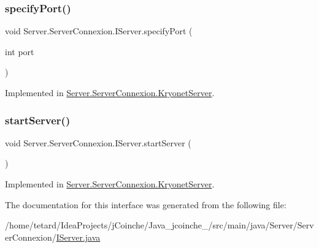 \mbox{\label{interfaceServer_1_1ServerConnexion_1_1IServer_a708adb2b4f2312b4319496d92357bd0e}} 
\subsubsection{\texorpdfstring{specify\+Port()}{specifyPort()}}
{\footnotesize\ttfamily void Server.\+Server\+Connexion.\+I\+Server.\+specify\+Port (\begin{DoxyParamCaption}\item[{int}]{port }\end{DoxyParamCaption})}



Implemented in \mbox{\hyperlink{classServer_1_1ServerConnexion_1_1KryonetServer_a5462e9f47eb97acd2d8353c825bf9f3b}{Server.\+Server\+Connexion.\+Kryonet\+Server}}.

\mbox{\label{interfaceServer_1_1ServerConnexion_1_1IServer_a13c33c54ae46ee73c99ae8b9a70b9397}} 
\subsubsection{\texorpdfstring{start\+Server()}{startServer()}}
{\footnotesize\ttfamily void Server.\+Server\+Connexion.\+I\+Server.\+start\+Server (\begin{DoxyParamCaption}{ }\end{DoxyParamCaption})}



Implemented in \mbox{\hyperlink{classServer_1_1ServerConnexion_1_1KryonetServer_a8bad9bf2baafbe83e2a6153c22b86bae}{Server.\+Server\+Connexion.\+Kryonet\+Server}}.



The documentation for this interface was generated from the following file\+:\begin{DoxyCompactItemize}
\item 
/home/tetard/\+Idea\+Projects/j\+Coinche/\+Java\+\_\+jcoinche\+\_/src/main/java/\+Server/\+Server\+Connexion/\mbox{\hyperlink{IServer_8java}{I\+Server.\+java}}\end{DoxyCompactItemize}
